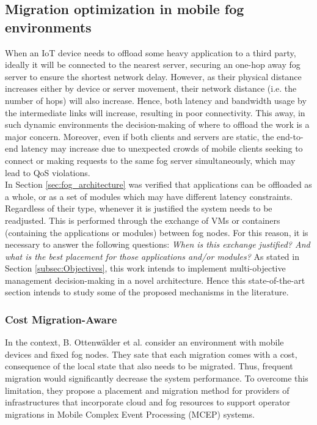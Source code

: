 \subsection{Migration optimization in mobile fog environments}
\label{sec:Migration}
When an IoT device needs to offload some heavy application to a third party, ideally it will be connected to the nearest server, securing an one-hop away fog server to ensure the shortest network delay. However, as their physical distance increases either by device or server movement, their network distance (i.e. the number of hops) will also increase. Hence, both latency and bandwidth usage by the intermediate links will increase, resulting in poor connectivity. This away, in such dynamic environments the decision-making of where to offload the work is a major concern. Moreover, even if both clients and servers are static, the end-to-end latency may increase due to unexpected crowds of mobile clients seeking to connect or making requests to the same fog server simultaneously, which may lead to QoS violations.\\
\noindent\tab In Section \ref{sec:fog_architecture} was verified that applications can be offloaded as a whole, or as a set of modules which may have different latency constraints. Regardless of their type, whenever it is justified the system needs to be readjusted. This is performed through the exchange of VMs or containers (containing the applications or modules) between fog nodes. For this reason, it is necessary to answer the following questions: \textit{When is this exchange justified? And what is the best placement for those applications and/or modules?} As stated in Section \ref{subsec:Objectives}, this work intends to implement multi-objective management decision-making in a novel architecture. Hence this state-of-the-art section intends to study some of the proposed mechanisms in the literature.

\subsubsection{Cost Migration-Aware}
\noindent\tab In the context, B. Ottenwälder et al. \cite{ottenwalder2013migcep} consider an environment with mobile devices and fixed fog nodes. They sate that each migration comes with a cost, consequence of the local state that also needs to be migrated. Thus, frequent migration would significantly decrease the system performance. To overcome this limitation, they propose a placement and migration method for providers of infrastructures that incorporate cloud and fog resources to support operator migrations in Mobile Complex Event Processing (MCEP) systems.



